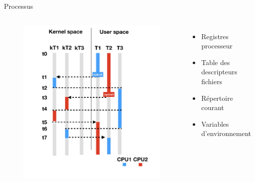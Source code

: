 

\begin{frame}{Processus}

\begin{columns}
\begin{figure}
    \centering
    \includegraphics[width=\textwidth]{slides/images/scheduling.jpg}
\end{figure}



\begin{itemize}[label=$-$]
    \item Registres processeur
    \item Table des descripteurs fichiers
    \item Répertoire courant
    \item Variables d'environnement
\end{itemize}
\end{columns}

\end{frame}


